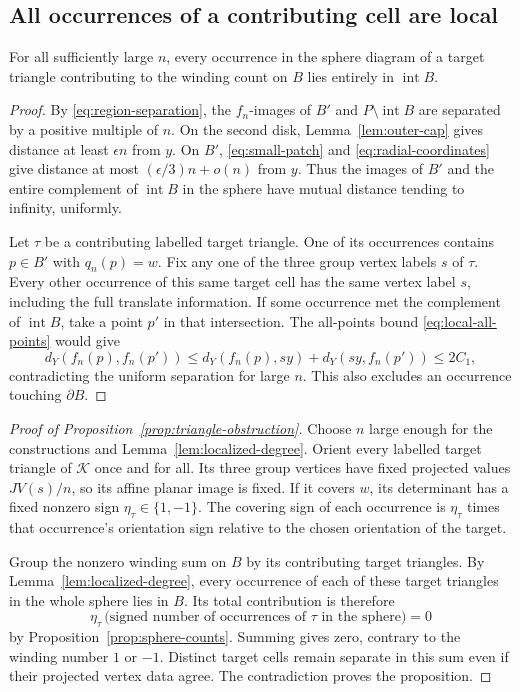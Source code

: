 \subsection{All occurrences of a contributing cell are local}

\begin{lemma}\label{lem:localized-degree}
For all sufficiently large \(n\), every occurrence in the sphere
diagram of a target triangle contributing to the winding count on
\(B\) lies entirely in \(\operatorname{int}B\).
\end{lemma}

\begin{proof}
By \eqref{eq:region-separation}, the \(f_n\)-images of \(B'\) and
\(P\setminus\operatorname{int}B\) are separated by a positive multiple
of \(n\).  On the second disk,
Lemma~\ref{lem:outer-cap} gives distance at least \(\epsilon n\) from
\(y\).  On \(B'\), \eqref{eq:small-patch} and
\eqref{eq:radial-coordinates} give distance at most
\((\epsilon/3)n+o(n)\) from \(y\).  Thus the images of \(B'\) and the
entire complement of \(\operatorname{int}B\) in the sphere have mutual
distance tending to infinity, uniformly.

Let \(\tau\) be a contributing labelled target triangle.  One of its
occurrences contains \(p\in B'\) with \(q_n(p)=w\).
Fix any one of the three group vertex labels \(s\) of \(\tau\).
Every other occurrence of this same target cell has the same vertex
label \(s\), including the full translate information.
If some occurrence met the complement of \(\operatorname{int}B\),
take a point \(p'\) in that intersection.  The all-points bound
\eqref{eq:local-all-points} would give
\[
 d_Y(f_n(p),f_n(p'))\le
 d_Y(f_n(p),sy)+d_Y(sy,f_n(p'))\le2C_1,
\]
contradicting the uniform separation for large \(n\).
This also excludes an occurrence touching \(\partial B\).
\end{proof}

\begin{proof}[Proof of Proposition~\ref{prop:triangle-obstruction}]
Choose \(n\) large enough for the constructions and
Lemma~\ref{lem:localized-degree}.  Orient every labelled target triangle
of \(\mathcal K\) once and for all.  Its three group vertices have fixed
projected values \(JV(s)/n\), so its affine planar image is fixed.
If it covers \(w\), its determinant has a fixed nonzero sign
\(\eta_\tau\in\{1,-1\}\).  The covering sign of each occurrence is
\(\eta_\tau\) times that occurrence's orientation sign relative to the
chosen orientation of the target.

Group the nonzero winding sum on \(B\) by its contributing target
triangles.  By Lemma~\ref{lem:localized-degree}, every occurrence of
each of these target triangles in the whole sphere lies in \(B\).
Its total contribution is therefore
\[
 \eta_\tau\,
 \bigl(\text{signed number of occurrences of }\tau
       \text{ in the sphere}\bigr)=0
\]
by Proposition~\ref{prop:sphere-counts}.  Summing gives zero, contrary
to the winding number \(1\) or \(-1\).
Distinct target cells remain separate in this sum even if their
projected vertex data agree.  The contradiction proves the proposition.
\end{proof}
